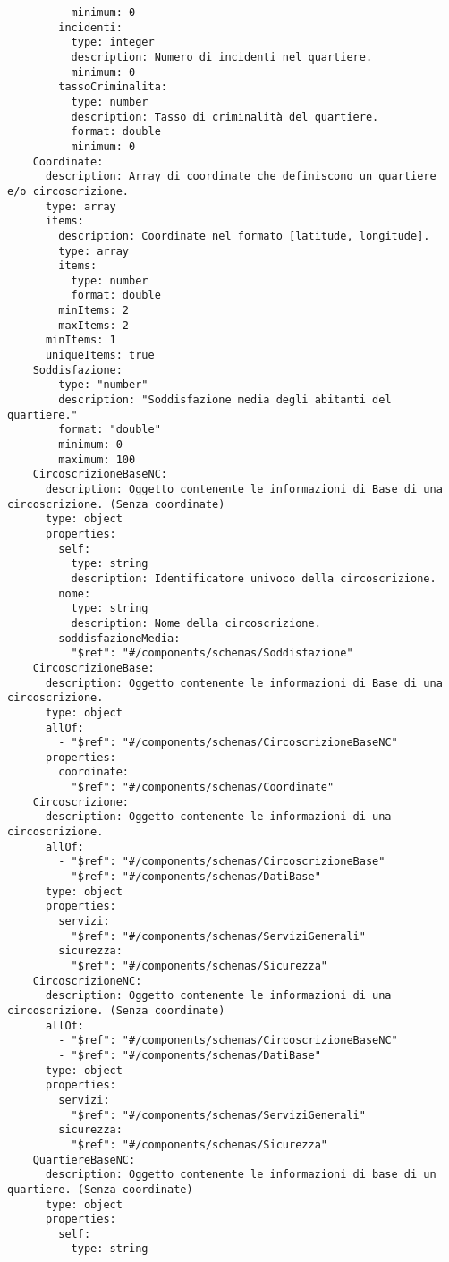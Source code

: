 \begin{verbatim}
          minimum: 0
        incidenti: 
          type: integer
          description: Numero di incidenti nel quartiere.
          minimum: 0
        tassoCriminalita:
          type: number
          description: Tasso di criminalità del quartiere.
          format: double
          minimum: 0
    Coordinate:
      description: Array di coordinate che definiscono un quartiere e/o circoscrizione.
      type: array
      items: 
        description: Coordinate nel formato [latitude, longitude].
        type: array
        items:
          type: number
          format: double
        minItems: 2
        maxItems: 2
      minItems: 1
      uniqueItems: true
    Soddisfazione: 
        type: "number"
        description: "Soddisfazione media degli abitanti del quartiere."
        format: "double"
        minimum: 0
        maximum: 100
    CircoscrizioneBaseNC: 
      description: Oggetto contenente le informazioni di Base di una circoscrizione. (Senza coordinate)
      type: object
      properties:
        self:
          type: string
          description: Identificatore univoco della circoscrizione.
        nome:
          type: string
          description: Nome della circoscrizione.
        soddisfazioneMedia:
          "$ref": "#/components/schemas/Soddisfazione"
    CircoscrizioneBase: 
      description: Oggetto contenente le informazioni di Base di una circoscrizione.
      type: object
      allOf:
        - "$ref": "#/components/schemas/CircoscrizioneBaseNC"
      properties:
        coordinate:
          "$ref": "#/components/schemas/Coordinate"
    Circoscrizione:
      description: Oggetto contenente le informazioni di una circoscrizione.
      allOf:
        - "$ref": "#/components/schemas/CircoscrizioneBase"
        - "$ref": "#/components/schemas/DatiBase"
      type: object
      properties:
        servizi:
          "$ref": "#/components/schemas/ServiziGenerali"
        sicurezza:
          "$ref": "#/components/schemas/Sicurezza"
    CircoscrizioneNC:
      description: Oggetto contenente le informazioni di una circoscrizione. (Senza coordinate)
      allOf:
        - "$ref": "#/components/schemas/CircoscrizioneBaseNC"
        - "$ref": "#/components/schemas/DatiBase"
      type: object
      properties:
        servizi:
          "$ref": "#/components/schemas/ServiziGenerali"
        sicurezza:
          "$ref": "#/components/schemas/Sicurezza"
    QuartiereBaseNC:
      description: Oggetto contenente le informazioni di base di un quartiere. (Senza coordinate)
      type: object
      properties:
        self:
          type: string

\end{verbatim}
